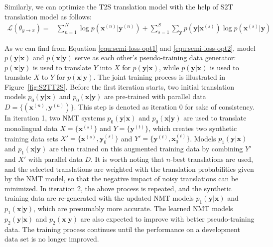\documentclass[a4paper]{article}
\begin{document}
\begin{CJK*}{UTF8}{gbsn}
Similarly, we can optimize the T2S translation model with the help of S2T translation model as follows:
\begin{equation}
\begin{aligned}
\mathcal{L}(\theta_{y\rightarrow x}) = & \sum_{n=1}^N \log p(\mathbf{x}^{(n)}|\mathbf{y}^{(n)})  + \sum_{s=1}^S\sum_{\mathbf{y}} p(\mathbf{y}|\mathbf{x}^{(s)}) \log p(\mathbf{x}^{(s)}|\mathbf{y})
\end{aligned}
\label{equ:semi-loss-opt2}
\end{equation}

As we can find from Equation \ref{equ:semi-loss-opt1} and \ref{equ:semi-loss-opt2},  model $p(\mathbf{y}|\mathbf{x})$ and $p(\mathbf{x}|\mathbf{y})$ serve as each other's pseudo-training data generator: $p(\mathbf{x}|\mathbf{y})$ is used to translate $Y$ into $X$ for $p(\mathbf{y}|\mathbf{x})$, while $p(\mathbf{y}|\mathbf{x})$ is used to translate $X$ to $Y$ for $p(\mathbf{x}|\mathbf{y})$.  
The joint training process is illustrated in Figure~\ref{fig:S2TT2S}. Before the first iteration starts, two initial translation models $p_0(\mathbf{y}|\mathbf{x})$ and $p_0(\mathbf{x}|\mathbf{y})$ are pre-trained with parallel data $D = \{(\mathbf{x}^{(n)},\mathbf{y}^{(n)})\}$. This step is denoted as iteration 0 for sake of consistency. In iteration 1, two NMT systems $p_0(\mathbf{y}|\mathbf{x})$ and $p_0(\mathbf{x}|\mathbf{y})$ are used to translate monolingual data $X=\{\mathbf{x}^{(s)}\}$ and $Y=\{\mathbf{y}^{(t)}\}$, which creates two synthetic training data sets $X'=\{\mathbf{x}^{(s)}, \mathbf{y}_0^{(s)}\}$ and $Y'=\{\mathbf{y}^{(t)}, \mathbf{x}_0^{(t)}\}$. 
Models $p_1(\mathbf{y}|\mathbf{x})$ and $p_1(\mathbf{x}|\mathbf{y})$ are then trained on this augmented training data by combining $Y'$ and $X'$ with parallel data $D$.
It is worth noting that $n$-best translations are used, and the selected translations are weighted with the translation probabilities given by the NMT model, so that the negative impact of noisy translations can be minimized. In iteration 2, the above process is repeated, and the synthetic training data are re-generated with the updated NMT models $p_1(\mathbf{y}|\mathbf{x})$ and $p_1(\mathbf{x}|\mathbf{y})$, which are presumably more accurate. The learned NMT models $p_2(\mathbf{y}|\mathbf{x})$ and $p_2(\mathbf{x}|\mathbf{y})$ are also expected to improve with better pseudo-training data. The training process continues until the performance on a development data set is no longer improved. 


\end{CJK*}
\end{document}

